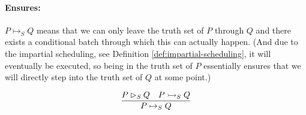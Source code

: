 \paragraph{Ensures:}
$P \mapsto_S Q$ means that we can only leave the truth set of $P$ through $Q$ and there exists a conditional batch through which this can actually happen. (And due to the impartial scheduling, see Definition \ref{def:impartial-scheduling}, it will eventually be executed, so being in the truth set of $P$ essentially ensures that we will directly step into the truth set of $Q$ at some point.)

\begin{equation}
    \label{eq:ensures}
    \infer{P \mapsto_S Q}{P \rhd_S Q & P \rightarrowtail_S Q}
\end{equation}

\begin{code}
    \>[2]\AgdaSpace{}%
    \AgdaSymbol{:}\AgdaSpace{}%
    \AgdaSpace{}%
    \AgdaSpace{}%
    \AgdaSpace{}%
    \AgdaSpace{}%
    \AgdaSpace{}%
    \AgdaSpace{}%
    \<%
    \\
    \>[2]\AgdaSpace{}%
    \AgdaSpace{}%
    \AgdaSpace{}%
    \AgdaSpace{}%
    \AgdaSymbol{=}\AgdaSpace{}%
    \AgdaSymbol{(}\AgdaSpace{}%
    \AgdaSpace{}%
    \AgdaSpace{}%
    \AgdaSpace{}%
    \AgdaSpace{}%
    \AgdaSpace{}%
    \AgdaSpace{}%
    \AgdaSpace{}%
    \AgdaSymbol{)}\<%
    \\
    \\[\AgdaEmptyExtraSkip]%
    \>[2]\AgdaSpace{}%
    \AgdaSpace{}%
    \<%
    \\
    \>[2]\AgdaSpace{}%
    \AgdaSymbol{:}\AgdaSpace{}%
    \AgdaSpace{}%
    \AgdaSpace{}%
    \AgdaSpace{}%
    \AgdaSpace{}%
    \AgdaSpace{}%
    \AgdaSpace{}%
    \<%
    \\
    \>[2]\AgdaSpace{}%
    \AgdaOperator{\AgdaFunction{↦[}}\AgdaSpace{}%
    \AgdaSpace{}%
    \AgdaOperator{\AgdaFunction{]}}\AgdaSpace{}%
    \AgdaSpace{}%
    \AgdaSymbol{=}\AgdaSpace{}%
    \AgdaSpace{}%
    \AgdaSpace{}%
    \AgdaSpace{}%
    \<%
\end{code}


